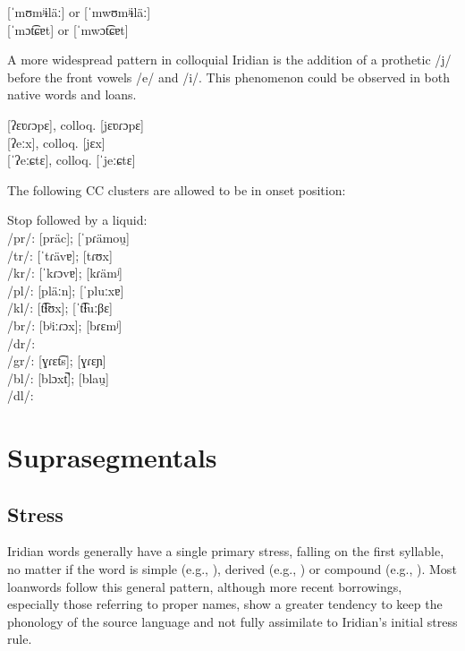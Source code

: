 \ex
{} [ˈmʊmʲɨläː] or [ˈmwʊmʲɨläː]\\
 [ˈmɔt͡ɕɐt] or [ˈmwɔt͡ɕɐt]
\xe

A more widespread pattern in colloquial Iridian is the addition of a prothetic
/j/ before the front vowels /e/ and /i/. This phenomenon could be observed in
both native words and loans.

\ex
{} [ʔɛʋɾɔpɛ], colloq. [jɛʋɾɔpɛ] \\
 [ʔeːx], colloq. [jɛx]\\
 [ˈʔeːɕtɛ], colloq. [ˈjeːɕtɛ]
\xe


The following CC clusters are allowed to be in onset position:

\pex
\a Stop followed by a liquid:\\
/pr/:  [präc];  [ˈpɾämou̯]\\
/tr/:  [ˈtɾävɐ];  [tɾʊx]\\
/kr/:  [ˈkɾɔvɐ];  [kɾämʲ]\\
/pl/:  [pläːn];  [ˈpluːxɐ]\\
/kl/:  [t͡ɬʊx];  [ˈt͡ɬuːβɛ]\\
/br/:  [bʲiːɾɔx];  [bɾɛmʲ]\\
/dr/: \\
/gr/:  [ɣɾɛt͡s];  [ɣɾɛɲ]\\
/bl/:  [blɔxt̚];  [blau̯]\\
/dl/:
\xe

\section{Suprasegmentals}

\subsection{Stress} Iridian words generally have a single primary
stress, falling on the first syllable, no matter if the word is simple (e.g.,
), derived (e.g., ) or
compound (e.g., ). Most loanwords follow this
general pattern, although more recent borrowings, especially those referring to
proper names, show a greater tendency to keep the phonology of the source
language and not fully assimilate to Iridian's initial stress rule.

